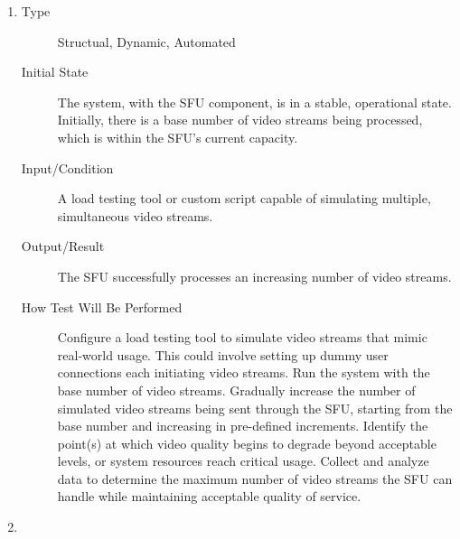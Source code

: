 \documentclass[12pt, titlepage]{article}
\begin{document}
\begin{enumerate}[NFR-T1]
\item \label{NFRT6}
  \begin{description}
  \item[Type] Structual, Dynamic, Automated
  \item[Initial State] The system, with the SFU component, is in a stable,
    operational state. Initially, there is a base number of video streams being
    processed, which is within the SFU's current capacity.
  \item[Input/Condition] A load testing tool or custom script capable of simulating
    multiple, simultaneous video streams.
  \item[Output/Result] The SFU successfully processes an increasing number of video
    streams.
  \item[How Test Will Be Performed] Configure a load testing tool to simulate video
    streams that mimic real-world usage. This could involve setting up dummy
    user connections each initiating video streams. Run the system with the base
    number of video streams. Gradually increase the number of simulated video
    streams being sent through the SFU, starting from the base number and
    increasing in pre-defined increments. Identify the point(s) at which video
    quality begins to degrade beyond acceptable levels, or system resources
    reach critical usage. Collect and analyze data to determine the maximum
    number of video streams the SFU can handle while maintaining acceptable
    quality of service.
  \end{description}
\item \label{NFRT7}

\end{enumerate}
\end{document}
